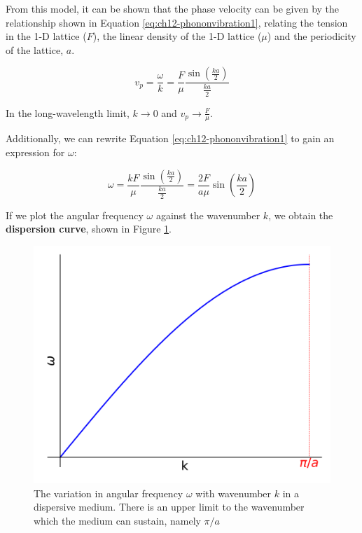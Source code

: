 \documentclass[
]{book}
\begin{document}
From this model, it can be shown that the phase velocity can be given by the relationship shown in Equation \eqref{eq:ch12-phononvibration1}, relating the tension in the 1-D lattice (\(F\)), the linear density of the 1-D lattice (\(\mu\)) and the periodicity of the lattice, \(a\).

\begin{equation}
v_{p} = \frac{\omega}{k} = \frac{F}{\mu}\frac{\sin \left(\frac{ka}{2}\right)}{\frac{ka}{2}}
\label{eq:ch12-phononvibration1}
\end{equation}

In the long-wavelength limit, \(k \rightarrow 0\) and \(v_p \rightarrow \frac{F}{\mu}\).

Additionally, we can rewrite Equation \eqref{eq:ch12-phononvibration1} to gain an expression for \(\omega\):

\begin{equation}
\omega = \frac{kF}{\mu}\frac{\sin \left(\frac{ka}{2}\right)}{\frac{ka}{2}} = \frac{2F}{a\mu}\sin \left(\frac{ka}{2}\right)
\label{eq:ch12-phononvibration2}
\end{equation}

If we plot the angular frequency \(\omega\) against the wavenumber \(k\), we obtain the \textbf{dispersion curve}, shown in Figure \ref{fig:ch12-dispersioncurve1}.

\begin{figure}

{\centering \includegraphics[width=0.7\linewidth]{visualisations/ch12-dispersioncurve1} 

}

\caption{The variation in angular frequency $\omega$ with wavenumber $k$ in a dispersive medium. There is an upper limit to the wavenumber which the medium can sustain, namely $\pi / a$}\label{fig:ch12-dispersioncurve1}
\end{figure}
\end{document}
